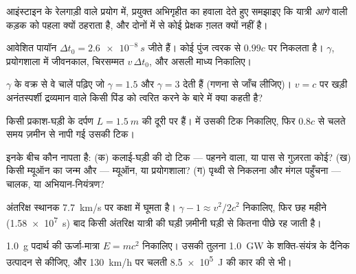 \begin{exercise}[$\star$]\label{exo:g12:special-relativity:5}
आइंस्टाइन के रेलगाड़ी वाले प्रयोग में, प्रयुक्त अभिगृहीत का हवाला देते हुए
समझाइए कि यात्री \emph{आगे} वाली कड़क को पहला क्यों ठहराता है, और दोनों में से
कोई प्रेक्षक ग़लत क्यों नहीं है।
\end{exercise}

\begin{exercise}[$\star\star$]\label{exo:g12:special-relativity:6}
आवेशित पायॉन $\Delta t_0 = \qty{2.6e-8}{s}$ जीते हैं। कोई पुंज त्वरक से $0.99c$ पर निकलता है।
$\gamma$, प्रयोगशाला में जीवनकाल, चिरसम्मत  $v\,\Delta t_0$, और असली माध्य
 निकालिए।
\end{exercise}

\begin{exercise}[$\star\star$]\label{exo:g12:special-relativity:7}
$\gamma$ के वक्र से वे चालें पढ़िए जो $\gamma = 1.5$ और $\gamma = 3$ देती हैं (गणना से जाँच
लीजिए)। $v = c$ पर खड़ी अनंतस्पर्शी द्रव्यमान वाले किसी पिंड को त्वरित करने के
बारे में क्या कहती है?
\end{exercise}

\begin{exercise}[$\star\star$]\label{exo:g12:special-relativity:8}
किसी प्रकाश-घड़ी के दर्पण $L = \qty{1.5}{m}$ की दूरी पर हैं।  में उसकी टिक निकालिए,
फिर $0.8c$ से चलते समय ज़मीन से नापी गई उसकी टिक।
\end{exercise}

\begin{exercise}[$\star\star$]\label{exo:g12:special-relativity:9}
इनके बीच  कौन नापता है: (क) कलाई-घड़ी की दो टिक --- पहनने वाला,
या पास से गुज़रता कोई? (ख) किसी म्यूऑन का जन्म और  --- म्यूऑन, या
प्रयोगशाला? (ग) पृथ्वी से निकलना और मंगल पहुँचना --- चालक, या अभियान-नियंत्रण?
\end{exercise}

\begin{exercise}[$\star\star$]\label{exo:g12:special-relativity:10}
अंतरिक्ष स्थानक \qty{7.7}{km/s} पर कक्षा में घूमता है। $\gamma - 1 \approx v^2/2c^2$ निकालिए, फिर छह
महीने (\qty{1.58e7}{s}) बाद किसी अंतरिक्ष यात्री की घड़ी ज़मीनी घड़ी से कितना पीछे रह
जाती है।
\end{exercise}

\begin{exercise}[$\star\star$]\label{exo:g12:special-relativity:11}
\qty{1.0}{g} पदार्थ की ऊर्जा-मात्रा $E = mc^2$ निकालिए। उसकी तुलना \qty{1.0}{GW} के
शक्ति-संयंत्र के दैनिक उत्पादन से कीजिए, और \qty{130}{km/h} पर चलती \qty{8.5e5}{J} की
कार की  से भी।
\end{exercise}

